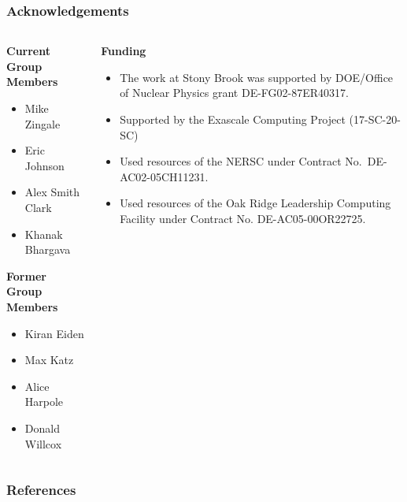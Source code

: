 \documentclass[
	11pt, %
]{beamer}
\begin{document}
\begin{frame}
	\frametitle{Acknowledgements}
	
	\begin{columns}[t] %
		\begin{column}{0.45\textwidth} %
			\textbf{Current Group Members}
			\begin{itemize}
				\item Mike Zingale
				\item Eric Johnson
                    \item Alex Smith Clark
                    \item Khanak Bhargava

			\end{itemize}

                \textbf{Former Group Members}
                \begin{itemize}
                    \item Kiran Eiden
                    \item Max Katz
                    \item Alice Harpole
                    \item Donald Willcox
                \end{itemize}
		\end{column}
  
		\begin{column}{0.5\textwidth} %
			\textbf{Funding}
			\begin{itemize}
				\item The work at Stony Brook was supported by DOE/Office of Nuclear Physics grant DE-FG02-87ER40317.
				\item Supported by the Exascale Computing  Project (17-SC-20-SC)
				\item Used resources of the NERSC under Contract No.\ DE-AC02-05CH11231. 
				\item Used resources of the Oak Ridge Leadership Computing Facility under Contract No. DE-AC05-00OR22725.
			\end{itemize}
		\end{column}
	\end{columns}
\end{frame}


\begin{frame}[allowframebreaks]%
	\frametitle{References}
    \printbibliography
\end{frame}
\end{document}

